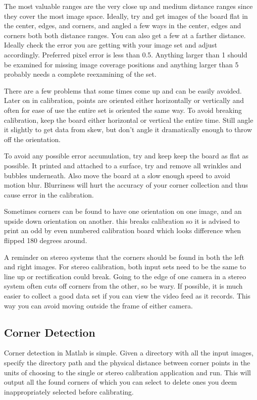 \documentclass{article}
\begin{document}
The most valuable ranges are the very close up and medium distance ranges since they cover the most image space. Ideally, try and get images of the board flat in the center, edges, and corners, and angled a few ways in the center, edges and corners both both distance ranges. You can also get a few at a farther distance. Ideally check the error you are getting with your image set and adjust accordingly. Preferred pixel error is less than 0.5. Anything larger than 1 should be examined for missing image coverage positions and anything larger than 5 probably needs a complete reexamining of the set.

There are a few problems that some times come up and can be easily avoided. Later on in calibration, points are oriented either horizontally or vertically and often for ease of use the entire set is oriented the same way. To avoid breaking calibration, keep the board either horizontal or vertical the entire time. Still angle it slightly to get data from skew, but don't angle it dramatically enough to throw off the orientation. 

To avoid any possible error accumulation, try and keep keep the board as flat as possible. It printed and attached to a surface, try and remove all wrinkles and bubbles underneath. Also move the board at a slow enough speed to avoid motion blur. Blurriness will hurt the accuracy of your corner collection and thus cause error in the calibration. 

Sometimes corners can be found to have one orientation on one image, and an upside down orientation on another. this breaks calibration so it is advised to print an odd by even numbered calibration board which looks difference when flipped 180 degrees around.

A reminder on stereo systems that the corners should be found in both the left and right images. For stereo calibration, both input sets need to be the same to line up or rectification could break. Going to the edge of one camera in a stereo system often cuts off corners from the other, so be wary. If possible, it is much easier to collect a good data set if you can view the video feed as it records. This way you can avoid moving outside the frame of either camera. 

\subsection{Corner Detection}

Corner detection in Matlab is simple. Given a directory with all the input images, specify the directory path and the physical distance between corner points in the units of choosing to the single or stereo calibration application and run. This will output all the found corners of which you can select to delete ones you deem inappropriately selected before calibrating. 
\end{document}
